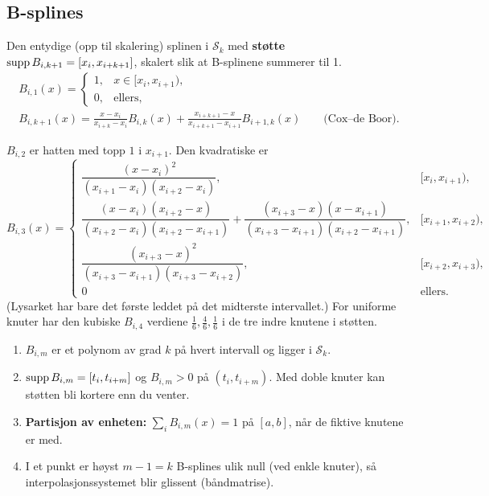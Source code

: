 \subsection{B-splines}
\begin{defn}[B-spline $B_{i,k+1}$ av orden $m=k+1$ (grad $k$)]
Den entydige (opp til skalering) splinen i $\mathcal S_k$ med \textbf{støtte} $\operatorname{supp} B_{i,k+1}=[x_i,x_{i+k+1}]$, skalert slik at B-splinene summerer til 1.
\begin{gather*}
B_{i,1}(x)=\begin{cases}1,&x\in[x_i,x_{i+1}),\\0,&\text{ellers},\end{cases}\\
B_{i,k+1}(x)=\frac{x-x_i}{x_{i+k}-x_i}B_{i,k}(x)+\frac{x_{i+k+1}-x}{x_{i+k+1}-x_{i+1}}B_{i+1,k}(x)\qquad\text{(Cox--de Boor)}.
\end{gather*}
\end{defn}
\begin{eksempel}
$B_{i,2}$ er hatten med topp $1$ i $x_{i+1}$. Den kvadratiske er
\[
B_{i,3}(x)=\begin{cases}
\dfrac{(x-x_i)^2}{(x_{i+1}-x_i)(x_{i+2}-x_i)},&[x_i,x_{i+1}),\\[8pt]
\dfrac{(x-x_i)(x_{i+2}-x)}{(x_{i+2}-x_i)(x_{i+2}-x_{i+1})}+\dfrac{(x_{i+3}-x)(x-x_{i+1})}{(x_{i+3}-x_{i+1})(x_{i+2}-x_{i+1})},&[x_{i+1},x_{i+2}),\\[8pt]
\dfrac{(x_{i+3}-x)^2}{(x_{i+3}-x_{i+1})(x_{i+3}-x_{i+2})},&[x_{i+2},x_{i+3}),\\[4pt]
0&\text{ellers}.
\end{cases}
\]
(Lysarket har bare det første leddet på det midterste intervallet.) For uniforme knuter har den kubiske $B_{i,4}$ verdiene $\frac16,\frac46,\frac16$ i de tre indre knutene i støtten.
\end{eksempel}
\begin{teorem}[egenskaper]
\begin{enumerate}
  \item $B_{i,m}$ er et polynom av grad $k$ på hvert intervall og ligger i $\mathcal S_k$.
  \item $\operatorname{supp} B_{i,m}=[t_i,t_{i+m}]$ og $B_{i,m}>0$ på $(t_i,t_{i+m})$. Med doble knuter kan støtten bli kortere enn du venter.
  \item \textbf{Partisjon av enheten:} $\sum_iB_{i,m}(x)=1$ på $[a,b]$, når de fiktive knutene er med.
  \item I et punkt er høyst $m-1=k$ B-splines ulik null (ved enkle knuter), så interpolasjonssystemet blir glissent (båndmatrise).
\end{enumerate}
\end{teorem}
